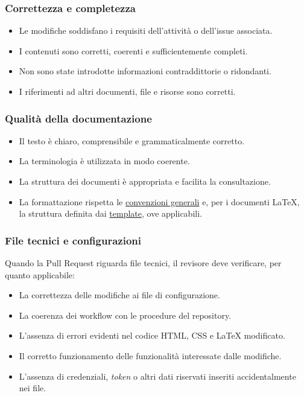 \documentclass[11pt, a4paper]{article}
\begin{document}
\subsubsection{Correttezza e completezza}

\begin{itemize}
    \item Le modifiche soddisfano i requisiti dell'attività o dell'issue associata.
    \item I contenuti sono corretti, coerenti e sufficientemente completi.
    \item Non sono state introdotte informazioni contraddittorie o ridondanti.
    \item I riferimenti ad altri documenti, file e risorse sono corretti.
\end{itemize}

\subsubsection{Qualità della documentazione}

\begin{itemize}
    \item Il testo è chiaro, comprensibile e grammaticalmente corretto.
    \item La terminologia è utilizzata in modo coerente.
    \item La struttura dei documenti è appropriata e facilita la consultazione.
    \item La formattazione rispetta le \hyperref[subsec:formattazione-del-testo]{convenzioni generali} e, per i documenti LaTeX, la struttura definita dai \href{https://github.com/On-By-One-Team/On-By-One.github.io/tree/main/docs/tex/templates}{template}, ove applicabili.
\end{itemize}

\subsubsection{File tecnici e configurazioni}

Quando la Pull Request riguarda file tecnici, il revisore deve verificare, per quanto applicabile:
\begin{itemize}
    \item La correttezza delle modifiche ai file di configurazione.
    \item La coerenza dei workflow con le procedure del repository.
    \item L'assenza di errori evidenti nel codice HTML, CSS e LaTeX modificato.
    \item Il corretto funzionamento delle funzionalità interessate dalle modifiche.
    \item L'assenza di credenziali, \textit{token} o altri dati riservati inseriti accidentalmente nei file.
\end{itemize}
\end{document}
